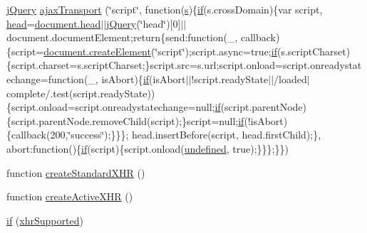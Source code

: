 \begin{DoxyCompactItemize}
\item 
\hyperlink{_scripts_2jquery-1_810_82_8js_a41c2e1bff4a6b292938143764e31d789}{j\+Query} \hyperlink{obj_2_release_2_package_2_package_tmp_2_scripts_2jquery-1_810_82_8js_ade7f5e1842214b9c2ed0c201344a110c}{ajax\+Transport} (\char`\"{}script\char`\"{}, function(\hyperlink{_scripts_2respond_8min_8js_ad9a7d92cb87932d25187fdec3ba1b621}{s})\{\hyperlink{_scripts_2respond_8min_8js_a93851d60dd037a83509a1757b9ee7b66}{if}(s.\+cross\+Domain)\{var script, \hyperlink{_scripts_2respond_8js_aeb4eed5f5e638eafa138655bd16be507}{head}=\hyperlink{_scripts_2respond_8js_aeb4eed5f5e638eafa138655bd16be507}{document.\+head}$\vert$$\vert$\hyperlink{_scripts_2jquery-1_810_82_8js_a41c2e1bff4a6b292938143764e31d789}{j\+Query}(\char`\"{}head\char`\"{})\mbox{[}0\mbox{]}$\vert$$\vert$document.\+document\+Element;return\{send\+:function(\+\_\+, callback)\{script=\hyperlink{_scripts_2dropzone_8js_a96f0c341e85b096ddfd669eee0981f51}{document.\+create\+Element}(\char`\"{}script\char`\"{});script.\+async=true;\hyperlink{_scripts_2respond_8min_8js_a93851d60dd037a83509a1757b9ee7b66}{if}(s.\+script\+Charset)\{script.\+charset=s.\+script\+Charset;\}script.\+src=s.\+url;script.\+onload=script.\+onreadystatechange=function(\+\_\+, is\+Abort)\{\hyperlink{_scripts_2respond_8min_8js_a93851d60dd037a83509a1757b9ee7b66}{if}(is\+Abort$\vert$$\vert$!script.\+ready\+State$\vert$$\vert$/loaded$\vert$complete/.test(script.\+ready\+State))\{script.\+onload=script.\+onreadystatechange=null;\hyperlink{_scripts_2respond_8min_8js_a93851d60dd037a83509a1757b9ee7b66}{if}(script.\+parent\+Node)\{script.\+parent\+Node.\+remove\+Child(script);\}script=null;\hyperlink{_scripts_2respond_8min_8js_a93851d60dd037a83509a1757b9ee7b66}{if}(!is\+Abort)\{callback(200,\char`\"{}success\char`\"{});\}\}\};   head.\+insert\+Before(script, head.\+first\+Child);\}, abort\+:function()\{\hyperlink{_scripts_2respond_8min_8js_a93851d60dd037a83509a1757b9ee7b66}{if}(script)\{script.\+onload(\hyperlink{_scripts_2jquery-1_810_82_8js_a08113a236cc18d2a9d5ce27e638012be}{undefined}, true);\}\}\};\}\})
\item 
function \hyperlink{obj_2_release_2_package_2_package_tmp_2_scripts_2jquery-1_810_82_8js_acea019a8b67e4d114deb75d1e0b3474a}{create\+Standard\+X\+H\+R} ()
\item 
function \hyperlink{obj_2_release_2_package_2_package_tmp_2_scripts_2jquery-1_810_82_8js_a54bf63f1b5f905292db45a1d6a9dc300}{create\+Active\+X\+H\+R} ()
\item 
\hyperlink{obj_2_release_2_package_2_package_tmp_2_scripts_2jquery-1_810_82_8js_ae2dd433d7bb020adf83db5351a0671e1}{if} (\hyperlink{_scripts_2jquery-1_810_82_8js_afd7e72f2f357a5a8b17e46776a6283eb}{xhr\+Supported})

\end{DoxyCompactItemize}
